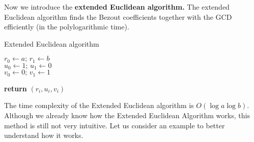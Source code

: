 \documentclass[../lecture-notes-148x210.tex]{subfiles}
\begin{document}
Now we introduce the \textbf{extended Euclidean algorithm.} The extended
Euclidean algorithm finds the Bezout coefficients together with the GCD
efficiently (in the polylogarithmic time).

\begin{algorithm}[H]
    \caption{Extended Euclidean algorithm} \label{alg:extended_euclidean}
        
    $r_{0} \gets a; \, r_{1} \gets b$ \\
    $u_{0} \gets 1; \, u_{1} \gets 0$ \\
    $v_{0} \gets 0; \, v_{1} \gets 1$ \\


    \textbf{return} $(r_i, u_i, v_i)$
\end{algorithm}

The time complexity of the Extended Euclidean algorithm is $O(\log{a} \log{b})$.
Although we already know how the Extended Euclidean Algorithm works, this method
is still not very intuitive. Let us consider an example to better understand how
it works.
\end{document}
